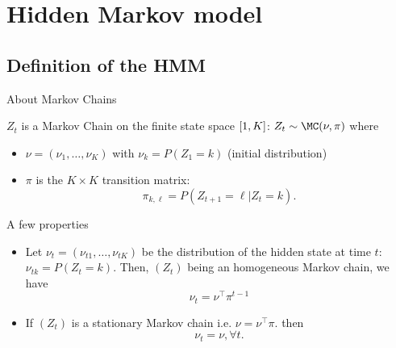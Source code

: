 \documentclass[compress,10pt]{beamer}
\begin{document}
%
% 


 
\section{Hidden Markov model}

\subsection{Definition of the HMM}
\begin{frame}{About Markov Chains}
 
$Z_t$ is a Markov Chain on the finite state  space  $\interval{1}{K}$: $
Z_t \sim \MC(\nu, \pi)
$ where 
\begin{itemize}
 \item $\nu = (\nu_1, \dots, \nu_K)$ with  $\nu_k = P(Z_1 = k)$   (initial distribution)
  \item $\pi$ is the $K \times K$ transition matrix:
$$
\pi_{k, \ell} = P(Z_{t+1} = \ell | Z_t = k).
$$
\end{itemize}
\textcolor{dgreen}{A few properties}
\begin{itemize}
 \item Let $\nu_t  = (\nu_{t1}, \dots, \nu_{tK})$  be the distribution of the hidden state at time $t$:
$
\nu_{tk} = P(Z_t = k).
$
Then, $(Z_t)$ being an homogeneous Markov chain, we have
$$
\nu_t = \nu^\intercal \pi^{t-1}
$$

\item If $(Z_t)$ is a \textcolor{dgreen}{stationary Markov chain} i.e. 
$
\nu = \nu^\intercal \pi.
$ 
then $$\nu_t = \nu, \forall t. $$
\end{itemize}
 

 
\end{frame}
\end{document}
